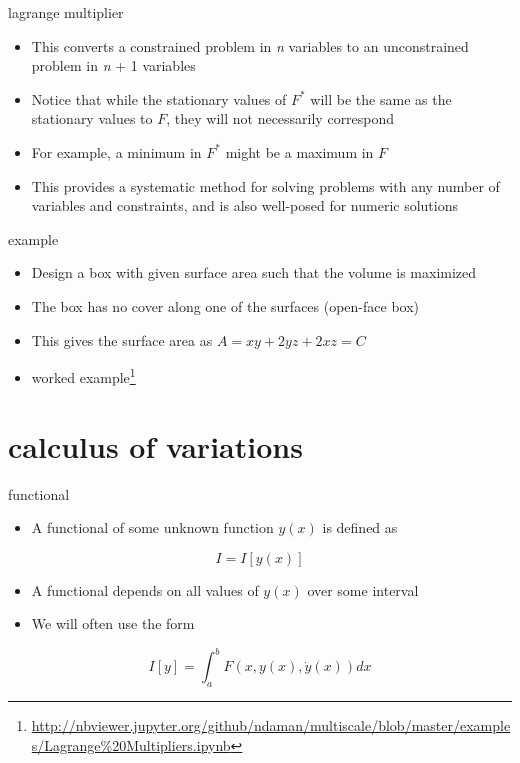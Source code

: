 \documentclass[
  letterpaper,
  ignorenonframetext,
  aspectratio=43,
  handout,
  12pt]{beamer}
\DeclareRobustCommand{\href}[2]{#2\footnote{\url{#1}}}
\providecommand{\tightlist}{%
  \setlength{\itemsep}{0pt}\setlength{\parskip}{0pt}}
\providecommand{\tightlist}{%
\setlength{\itemsep}{0pt}\setlength{\parskip}{0pt}}
\begin{document}
\begin{frame}{lagrange multiplier}
\protect\hypertarget{lagrange-multiplier-2}{}
\begin{itemize}
\tightlist
\item
  This converts a constrained problem in \emph{n} variables to an
  unconstrained problem in \emph{n} + 1 variables
\item
  Notice that while the stationary values of \(F^*\) will be the same as
  the stationary values to \(F\), they will not necessarily correspond
\item
  For example, a minimum in \(F^*\) might be a maximum in \(F\)
\item
  This provides a systematic method for solving problems with any number
  of variables and constraints, and is also well-posed for numeric
  solutions
\end{itemize}
\end{frame}

\begin{frame}{example}
\protect\hypertarget{example}{}
\begin{itemize}
\tightlist
\item
  Design a box with given surface area such that the volume is maximized
\item
  The box has no cover along one of the surfaces (open-face box)
\item
  This gives the surface area as \(A = xy + 2yz + 2xz = C\)
\item
  \href{http://nbviewer.jupyter.org/github/ndaman/multiscale/blob/master/examples/Lagrange\%20Multipliers.ipynb}{worked
  example}
\end{itemize}
\end{frame}

\hypertarget{calculus-of-variations}{%
\section{calculus of variations}\label{calculus-of-variations}}

\begin{frame}{functional}
\protect\hypertarget{functional}{}
\begin{itemize}
\tightlist
\item
  A functional of some unknown function \(y(x)\) is defined as
\end{itemize}

\[ I = I[y(x)]\]

\begin{itemize}
\tightlist
\item
  A functional depends on all values of \(y(x)\) over some interval
\item
  We will often use the form
\end{itemize}

\[I[y] = \int_a^b F(x,y(x),\dot{y}(x))dx\]
\end{frame}
\end{document}
